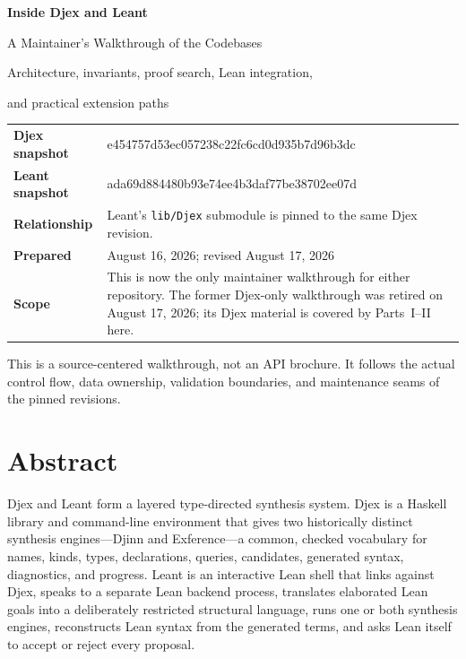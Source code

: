 \documentclass[10pt,letterpaper,oneside]{report}
\newcommand{\filepath}[1]{\nolinkurl{#1}}
\newcommand{\commitid}[1]{{\ttfamily\footnotesize #1}}
\begin{document}
\hypersetup{pageanchor=false}
\begin{titlepage}
\centering
\vspace*{0.8in}
{\Huge\bfseries\color{Ink} Inside Djex and Leant\par}
\vspace{0.25in}
{\LARGE\color{DeepBlue} A Maintainer's Walkthrough of the Codebases\par}
\vspace{0.2in}
{\large Architecture, invariants, proof search, Lean integration,\par
and practical extension paths\par}
\vspace{0.8in}
\begin{tcolorbox}[width=0.86\textwidth,colback=SoftGray,colframe=RuleGray,boxrule=0.7pt,arc=1mm]
\small
\begin{tabularx}{\textwidth}{@{}L{0.18\textwidth}Y@{}}
\textbf{Djex snapshot} & \commitid{e454757d53ec057238c22fc6cd0d935b7d96b3dc} \\
\textbf{Leant snapshot} & \commitid{ada69d884480b93e74ee4b3daf77be38702ee07d} \\
\textbf{Relationship} & Leant's \filepath{lib/Djex} submodule is pinned to the same Djex revision. \\
\textbf{Prepared} & August 16, 2026; revised August 17, 2026 \\
\textbf{Scope} & This is now the only maintainer walkthrough for either repository. The former Djex-only walkthrough was retired on August 17, 2026; its Djex material is covered by Parts~I--II here. \\
\end{tabularx}
\end{tcolorbox}
\vfill
\vspace{0.25in}
{\small This is a source-centered walkthrough, not an API brochure. It follows the actual control flow, data ownership, validation boundaries, and maintenance seams of the pinned revisions.\par}
\end{titlepage}
\clearpage
\hypersetup{pageanchor=true}
\chapter*{Abstract}

Djex and Leant form a layered type-directed synthesis system. Djex is a Haskell library and command-line environment that gives two historically distinct synthesis engines---Djinn and Exference---a common, checked vocabulary for names, kinds, types, declarations, queries, candidates, generated syntax, diagnostics, and progress. Leant is an interactive Lean shell that links against Djex, speaks to a separate Lean backend process, translates elaborated Lean goals into a deliberately restricted structural language, runs one or both synthesis engines, reconstructs Lean syntax from the generated terms, and asks Lean itself to accept or reject every proposal.
\end{document}
